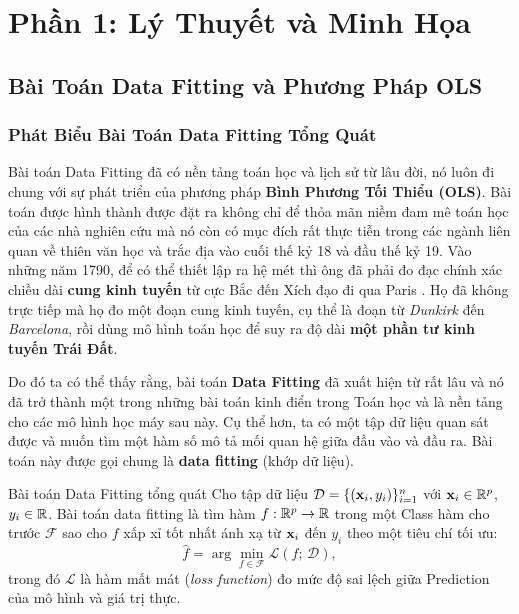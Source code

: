 ﻿\section{Phần 1: Lý Thuyết và Minh Họa}

\subsection{Bài Toán Data Fitting và Phương Pháp OLS}

\subsubsection{Phát Biểu Bài Toán Data Fitting Tổng Quát}
Bài toán Data Fitting đã có nền tảng toán học và lịch sử từ lâu đời, nó luôn đi chung với sự phát triển của phương pháp \textbf{Bình Phương Tối Thiểu (OLS)}. Bài toán được hình thành được đặt ra không chỉ để thỏa mãn niềm đam mê toán học của các nhà nghiên cứu mà nó còn có mục đích rất thực tiễn trong các ngành liên quan về thiên văn học và trắc địa vào cuối thế kỷ 18 và đầu thế kỷ 19.
Vào những năm 1790, để có thể thiết lập ra hệ mét  thì ông đã phải đo đạc chính xác chiều dài \textbf{cung kinh tuyến} từ cực Bắc đến Xích đạo đi qua Paris \cite{stigler1996}. Họ đã không trực tiếp mà họ đo một đoạn cung kinh tuyến, cụ thể là đoạn từ \textit{Dunkirk} đến \textit{Barcelona}, rồi dùng mô hình toán học để suy ra độ dài \textbf{một phần tư kinh tuyến Trái Đất}.

Do đó ta có thể thấy rằng, bài toán \textbf{Data Fitting} đã xuất hiện từ rất lâu và nó đã trở thành một trong những bài toán kinh điển trong Toán học và là nền tảng cho các mô hình học máy sau này. Cụ thể hơn, ta có một tập dữ liệu quan sát được
và muốn tìm một hàm số mô tả mối quan hệ giữa đầu vào và đầu ra. Bài toán này
được gọi chung là \textbf{data fitting} (khớp dữ liệu).

\begin{mydef}{Bài toán Data Fitting tổng quát}{}
Cho tập dữ liệu $\mathcal{D} = \{(\mathbf{x}_i, y_i)\}_{i=1}^n$ với
$\mathbf{x}_i \in \mathbb{R}^p$, $y_i \in \mathbb{R}$. Bài toán data fitting là tìm hàm
$f : \mathbb{R}^p \to \mathbb{R}$ trong một Class hàm cho trước $\mathcal{F}$ sao cho
$f$ xấp xỉ tốt nhất ánh xạ từ $\mathbf{x}_i$ đến $y_i$ theo một tiêu chí tối ưu:
\[
    \hat{f} = \arg\min_{f \in \mathcal{F}} \mathcal{L}(f;\, \mathcal{D}),
\]
trong đó $\mathcal{L}$ là hàm mất mát (\textit{loss function}) đo mức độ sai lệch
giữa Prediction của mô hình và giá trị thực.
\end{mydef}


